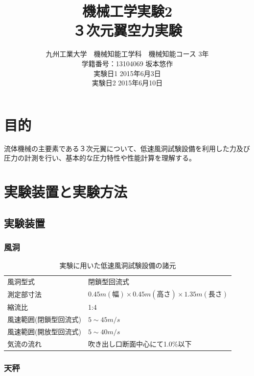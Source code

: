 \documentclass[a4j,twoside,openright,11pt]{jarticle}
\title{機械工学実験2\\３次元翼空力実験}
\author{九州工業大学　機械知能工学科　機械知能コース 3年\\学籍番号：13104069 坂本悠作 \\実験日1 2015年6月3日 \\ 実験日2 2015年6月10日}
\begin{document}
\maketitle
\newpage

\section{目的}
流体機械の主要素である３次元翼について、低速風洞試験設備を利用した力及び圧力の計測を行い、基本的な圧力特性や性能計算を理解する。

\section{実験装置と実験方法}
\subsection{実験装置}
\subsubsection{風洞}

\begin{table}[htb]
\begin{center}
  \caption{実験に用いた低速風洞試験設備の諸元}
  \begin{tabular}{ll} \hline
風洞型式                &閉鎖型回流式\\
測定部寸法              &$0.45m(幅)\times 0.45m(高さ) \times 1.35m(長さ) $\\
縮流比                  &1:4\\
風速範囲(閉鎖型回流式)  &$5 \sim 45 m/s$\\
風速範囲(開放型回流式)  &$5 \sim 40 m/s$\\
気流の流れ              &吹き出し口断面中心にて1.0\%以下\\
\hline
  \end{tabular}
\end{center}
\end{table}

\subsubsection{天秤}
\end{document}
